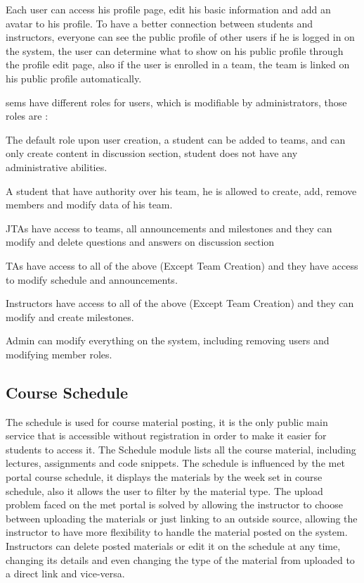\newParagraph
Each user can access his profile page, edit his basic information and add an avatar to his profile. To have a better connection
between students and instructors, everyone can see the public profile of other users if he is logged in on the system, the user
can determine what to show on his public profile through the profile edit page, also if the user is enrolled in a team, the team
is linked on his public profile automatically.

\newParagraph
\ac{sems} have different roles for users, which is modifiable by administrators, those roles are :

\begin{description}[align=left]
\item [student] The default role upon user creation, a student can be added to teams, and can only create content in discussion section,
student does not have any administrative abilities.
\item [scrum master] A student that have authority over his team, he is allowed to create, add, remove members and modify data of his team.
\item [\ac{jta}] JTAs have access to teams, all announcements and milestones and they can modify and delete questions and answers on discussion section
\item [\ac{ta}] TAs have access to all of the above (Except Team Creation) and they have access to modify schedule and announcements.
\item [Instructor] Instructors have access to all of the above (Except Team Creation) and they can modify and create milestones.
\item [Admin] Admin can modify everything on the system, including removing users and modifying member roles.
\end{description}

\subsection{Course Schedule}
\label{sub:schedule}
The schedule is used for course material posting, it is the only public main service that is accessible without registration in order to make
it easier for students to access it. The Schedule module lists all the course material, including lectures, assignments and code snippets. The schedule
is influenced by the \ac{met} portal course schedule, it displays the materials by the week set in course schedule, also it allows the user
to filter by the material type. The upload problem faced on the \ac{met} portal is solved by allowing the instructor to choose between uploading
the materials or just linking to an outside source, allowing the instructor to have more flexibility to handle the material posted on the system.
Instructors can delete posted materials or edit it on the schedule at any time, changing its details and even changing the type of the material from
uploaded to a direct link and vice-versa.

